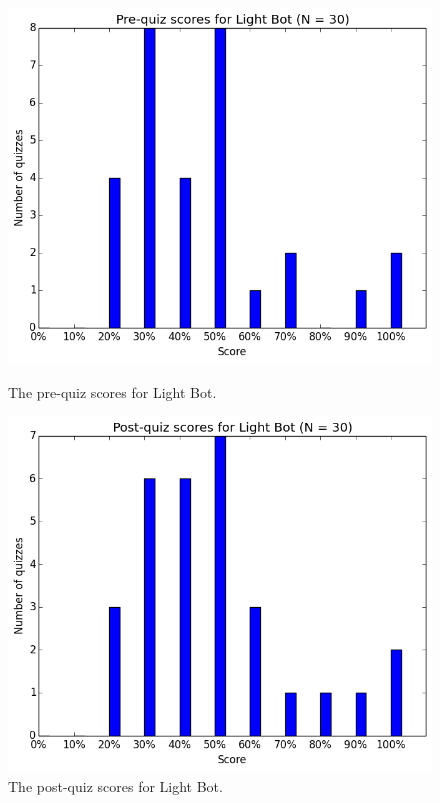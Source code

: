			\begin{figure}[] 
			\centering 
			\begin{minipage}[b]{0.45\linewidth}
			\includegraphics[width=\textwidth]{lightbot_pre.png} 
			\caption{The pre-quiz scores for Light Bot.}
			\end{minipage}
			\quad
			\begin{minipage}[b]{0.45\linewidth}
			\includegraphics[width=\textwidth]{lightbot_post.png} 
			\caption{The post-quiz scores for Light Bot.}
			\end{minipage}
			\end{figure}

